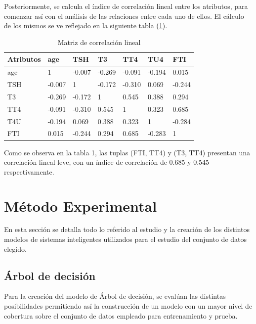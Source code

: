 \documentclass[osajnl,twocolumn,showpacs,superscriptaddress,10pt,floatfix]{revtex4-1} %
\begin{document}
Posteriormente, se calcula el índice de correlación lineal entre los atributos, para comenzar así con el análisis de las relaciones entre cada uno de ellos. El cálculo de los mismos se ve reflejado en la siguiente tabla (\ref{table:correlation_matrix}). \\

\begin{table}[htb]
    \centering
    \begin{tabular}{|l|l|l|l|l|l|l|}
        \hline
        Atributos & age & TSH & T3 & TT4 & TU4 & FTI \\
        \hline
        age & 1 & -0.007 & -0.269 & -0.091 & -0.194 & 0.015 \\
        \hline
        TSH & -0.007 & 1 & -0.172 & -0.310 & 0.069 & -0.244 \\
        \hline
        T3 & -0.269 & -0.172 & 1 & 0.545 & 0.388 & 0.294 \\
        \hline
        TT4 & -0.091 & -0.310 & 0.545 & 1 & 0.323 & 0.685 \\
        \hline
        T4U & -0.194 & 0.069 & 0.388 & 0.323 & 1 & -0.284 \\
        \hline
        FTI & 0.015 & -0.244 & 0.294 & 0.685 & -0.283 & 1 \\
        \hline
    \end{tabular}
    \caption{Matriz de correlación lineal}
    \label{table:correlation_matrix}
\end{table}

Como se observa en la tabla 1, las tuplas (FTI, TT4) y (T3, TT4) presentan una correlación lineal leve, con un índice de correlación de 0.685 y 0.545 respectivamente. \\

\section{Método Experimental}

En esta sección se detalla todo lo referido al estudio y la creación de los distintos modelos de sistemas inteligentes utilizados para el estudio del conjunto de datos elegido. \\

\subsection{Árbol de decisión}

Para la creación del modelo de Árbol de decisión, se evalúan las distintas posibilidades permitiendo así la construcción de un modelo con un mayor nivel de cobertura sobre el conjunto de datos empleado para entrenamiento y prueba. \\
\end{document}
